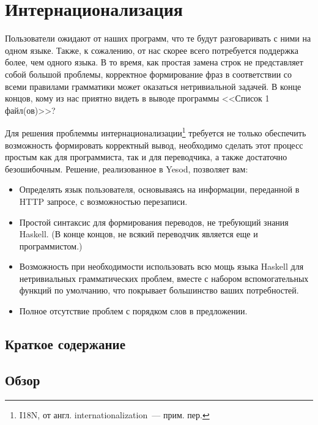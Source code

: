 \chapter{Интернационализация}\label{chap:i18n} %

Пользователи ожидают от наших программ, что те будут разговаривать с ними на одном языке. Также, к сожалению, от нас скорее всего потребуется поддержка более, чем одного языка. В то время, как простая замена строк не представляет собой большой проблемы, корректное формирование фраз в соответствии со всеми правилами грамматики может оказаться нетривиальной задачей. В конце концов, кому из нас приятно видеть в выводе программы <<Список 1 файл(ов)>>?

Для решения проблеммы интернационализации\footnote{I18N, от англ. internationalization~--- прим. пер.} требуется не только обеспечить возможность формировать корректный вывод, необходимо сделать этот процесс простым как для программиста, так и для переводчика, а также достаточно безошибочным. Решение, реализованное в Yesod, позволяет вам:

\begin{itemize}
  \item Определять язык пользователя, основываясь на информации, переданной в HTTP запросе, с возможностью перезаписи.
  \item Простой синтаксис для формирования переводов, не требующий знания Haskell. (В конце концов, не всякий переводчик является еще и программистом.)
  \item Возможность при необходимости использовать всю мощь языка Haskell для нетривиальных грамматических проблем, вместе с набором вспомогательных функций по умолчанию, что покрывает большинство ваших потребностей.
  \item Полное отсутствие проблем с порядком слов в предложении. %
\end{itemize}

\section{Краткое содержание} %



\section{Обзор} %


